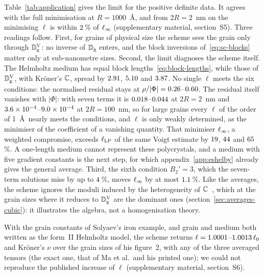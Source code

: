 Table~\ref{tab:application} gives the limit for the positive definite data. It agrees
with the full minimisation at $R=1000$~\AA, and from $2R=2$~nm on the minimising $\ell$ is
within $2$\,\% of $\linf$ (supplementary material, section~S5). Three
readings follow. First, for grains of physical size the scheme sees the grain only through
$\mathbb{D}_{\mathrm{g}}^{\mathrm{V}}$: no inverse of $\mathbb{D}_{\mathrm{g}}$ enters, and the block inversions
of~\eqref{eq:sc-blocks} matter only at sub-nanometre sizes. Second, the limit diagnoses the
scheme itself. The Helmholtz medium has equal block lengths~\eqref{eq:block-lengths}, while
those of $\mathbb{D}_{\mathrm{g}}^{\mathrm{V}}$, with Kr\"oner's $\tC$, spread by $2.91$,
$5.10$ and $3.87$. No single $\ell$ meets the
six conditions: the normalised residual stays at
$\rho/|\Phi|=0.26$--$0.60$. The residual itself
vanishes with $|\Phi|$: with seven terms it is $0.018$--$0.044$
at $2R=2$~nm and $3.6\times10^{-4}$--$9.0\times10^{-4}$ at $2R=100$~nm, so
for large grains every $\ell$ of the order of 1~\AA\ nearly meets the conditions,
and $\ell$ is only weakly determined, as the minimiser of the coefficient of a vanishing
quantity. That minimiser $\linf$, a weighted compromise, exceeds $\lLP$ of the same Voigt estimate by $19$,
$44$ and $65$\,\%. A one-length
medium cannot represent these polycrystals, and a medium with five gradient constants is
the next step, for which appendix~\ref{app:eshelby} already gives the general average.
Third, the sixth condition $B_2'=3$, which the seven-term solutions miss by up to
$4$\,\%, moves $\linf$ by at most $1.1$\,\%. Like the averages, the scheme
ignores the moduli induced by the heterogeneity of $\tC$~\cite{Malyi2021}, which at the
grain sizes where it reduces to $\mathbb{D}_{\mathrm{g}}^{\mathrm{V}}$ are the dominant ones
(section~\ref{sec:averages-cubic}): it illustrates the algebra, not a homogenisation
theory.

With the grain constants of Solyaev's iron example, and grain and medium both written as the
form~II Helmholtz model, the scheme returns $\ell=1.0001$--$1.0013\,\ell_0$
and Kr\"oner's $\nu$ over the grain sizes of his figure~2, with any of the three averaged
tensors (the exact one, that of Ma et al.\ and his printed one); we could not reproduce the
published increase of $\ell$ (supplementary material, section~S6).

\begin{table}[pos=tbp]
\caption{Self-consistent estimate for large grains~\eqref{eq:sc-linf}: Poisson's ratio
$\nu_{\mathrm K}$ of Kr\"oner's classical estimate, with the bulk modulus of the grain; length
$\linf$ and normalised residual $\scres/|\Phi|$ with seven terms and, in brackets, eight;
spread $\ell_{\max}/\ell_{\min}$ of the block lengths~\eqref{eq:block-lengths} of the Voigt
estimate and its $\lLP$~\eqref{eq:lazar-po-length}, both relative to Kr\"oner's $\tC$.
Digits as in table~\ref{tab:averages}.}\label{tab:application}
\centering\small

\end{table}

